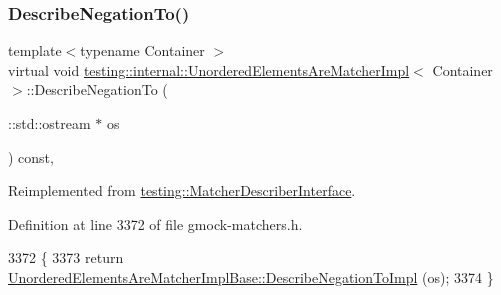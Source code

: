 \mbox{\label{classtesting_1_1internal_1_1UnorderedElementsAreMatcherImpl_af2185915595c02d6132ba5f3f9ccb6cd}} 
\subsubsection{\texorpdfstring{Describe\+Negation\+To()}{DescribeNegationTo()}}
{\footnotesize\ttfamily template$<$typename Container $>$ \\
virtual void \hyperlink{classtesting_1_1internal_1_1UnorderedElementsAreMatcherImpl}{testing\+::internal\+::\+Unordered\+Elements\+Are\+Matcher\+Impl}$<$ Container $>$\+::Describe\+Negation\+To (\begin{DoxyParamCaption}\item[{\+::std\+::ostream $\ast$}]{os }\end{DoxyParamCaption}) const\hspace{0.3cm}{\ttfamily [inline]}, {\ttfamily [virtual]}}



Reimplemented from \hyperlink{classtesting_1_1MatcherDescriberInterface_a2071afbc47097c4d1c0064275af34db0}{testing\+::\+Matcher\+Describer\+Interface}.



Definition at line 3372 of file gmock-\/matchers.\+h.


\begin{DoxyCode}
3372                                                         \{
3373     \textcolor{keywordflow}{return} \hyperlink{classtesting_1_1internal_1_1UnorderedElementsAreMatcherImplBase_ab3ca5ae4aef146b093a3fb35f53d1a38}{UnorderedElementsAreMatcherImplBase::DescribeNegationToImpl}
      (os);
3374   \}
\end{DoxyCode}
\mbox{\label{classtesting_1_1internal_1_1UnorderedElementsAreMatcherImpl_a3f6e292c6452db028b7671618577d9f0}} 
